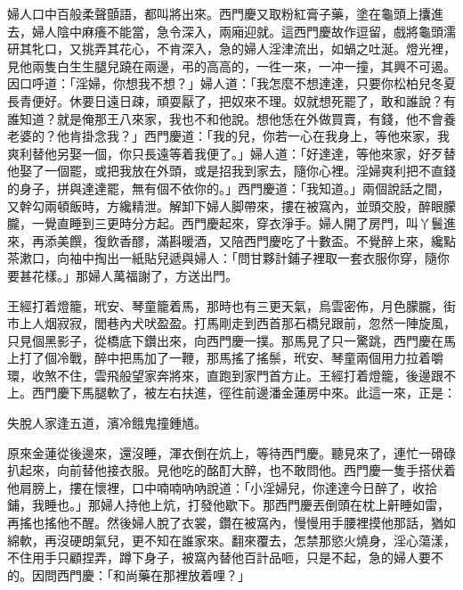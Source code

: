 婦人口中百般柔聲顫語，都叫將出來。{}西門慶又取粉紅膏子藥，塗在龜頭上攮進去，婦人陰中麻癢不能當，急令深入，兩廂迎就。這西門慶故作逗留，戲將龜頭濡研其牝口，又挑弄其花心，不肯深入，急的婦人淫津流出，如蝸之吐涎。燈光裡，見他兩隻白生生腿兒蹺在兩邊，弔的高高的，一徃一來，一冲一撞，其興不可遏。因口呼道：「淫婦，你想我不想？」婦人道：「我怎麼不想達達，只要你松柏兒冬夏長青便好。休要日遠日疎，頑耍厭了，把奴來不理。奴就想死罷了，敢和誰說？有誰知道？就是俺那王八來家，我也不和他說。想他恁在外做買賣，有錢，他不會養老婆的？他肯掛念我？」西門慶道：「我的兒，你若一心在我身上，等他來家，我爽利替他另娶一個，你只長遠等着我便了。」婦人道：「好達達，等他來家，好歹替他娶了一個罷，或把我放在外頭，或是招我到家去，隨你心裡。淫婦爽利把不直錢的身子，拼與達達罷，無有個不依你的。」{}西門慶道：「我知道。」兩個說話之間，又幹勾兩頓飯時，方纔精泄。解卸下婦人脚帶來，摟在被窩內，並頭交股，醉眼朦朧，一覺直睡到三更時分方起。西門慶起來，穿衣淨手。婦人開了房門，叫丫鬟進來，再添美饌，復飲香醪，滿斟暖酒，又陪西門慶吃了十數盃。不覺醉上來，纔點茶漱口，向袖中掏出一紙貼兒遞與婦人：「問甘夥計鋪子裡取一套衣服你穿，隨你要甚花樣。」那婦人萬福謝了，方送出門。

王經打着燈籠，玳安、琴童籠着馬，那時也有三更天氣，烏雲密佈，月色朦朧，街市上人烟寂寂，閭巷內犬吠盈盈。打馬剛走到西首那石橋兒跟前，忽然一陣旋風，只見個黑影子，從橋底下鑽出來，向西門慶一撲。{}那馬見了只一驚跳，西門慶在馬上打了個冷戰，醉中把馬加了一鞭，那馬搖了搖鬃，玳安、琴童兩個用力拉着嚼環，收煞不住，雲飛般望家奔將來，直跑到家門首方止。王經打着燈籠，後邊跟不上。西門慶下馬腿軟了，被左右扶進，徑徃前邊潘金蓮房中來。{}此這一來，正是：

\begin{myquote} 
失脫人家逢五道，濱冷餓鬼撞鍾馗。
\end{myquote} 

原來金蓮從後邊來，還沒睡，渾衣倒在炕上，等待西門慶。聽見來了，連忙一磆碌扒起來，向前替他接衣服。見他吃的酩酊大醉，也不敢問他。西門慶一隻手搭伏着他肩膀上，摟在懷裡，口中喃喃吶吶說道：「小淫婦兒，你達達今日醉了，收拾鋪，我睡也。」那婦人持他上炕，打發他歇下。那西門慶丟倒頭在枕上鼾睡如雷，再搖也搖他不醒。然後婦人脫了衣裳，鑽在被窩內，慢慢用手腰裡摸他那話，猶如綿軟，再沒硬朗氣兒，更不知在誰家來。翻來覆去，怎禁那慾火燒身，淫心蕩漾，不住用手只顧捏弄，蹲下身子，被窩內替他百計品咂，只是不起，急的婦人要不的。因問西門慶：「和尚藥在那裡放着哩？」


